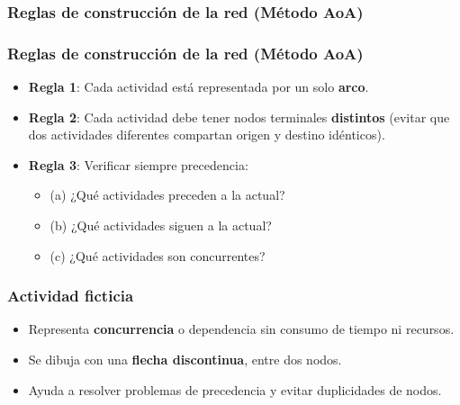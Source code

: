 \documentclass{beamer}
\begin{document}
\subsubsection{Reglas de construcción de la red (Método AoA)}
\begin{frame}
\frametitle{Reglas de construcción de la red (Método AoA)}

\begin{itemize}
    \item \textbf{Regla 1}: Cada actividad está representada por un solo \textbf{arco}.
    \item \textbf{Regla 2}: Cada actividad debe tener nodos terminales \textbf{distintos} (evitar que dos actividades diferentes compartan origen y destino idénticos).
    \item \textbf{Regla 3}: Verificar siempre precedencia:
        \begin{itemize}
            \item (a) ¿Qué actividades preceden a la actual?
            \item (b) ¿Qué actividades siguen a la actual?
            \item (c) ¿Qué actividades son concurrentes?
        \end{itemize}
\end{itemize}

\end{frame}

\begin{frame}
\frametitle{Actividad ficticia}

\begin{itemize}
    \item Representa \textbf{concurrencia} o dependencia sin consumo de tiempo ni recursos.
    \item Se dibuja con una \textbf{flecha discontinua}, entre dos nodos.
    \item Ayuda a resolver problemas de precedencia y evitar duplicidades de nodos.
\end{itemize}

\end{frame}
\end{document}
